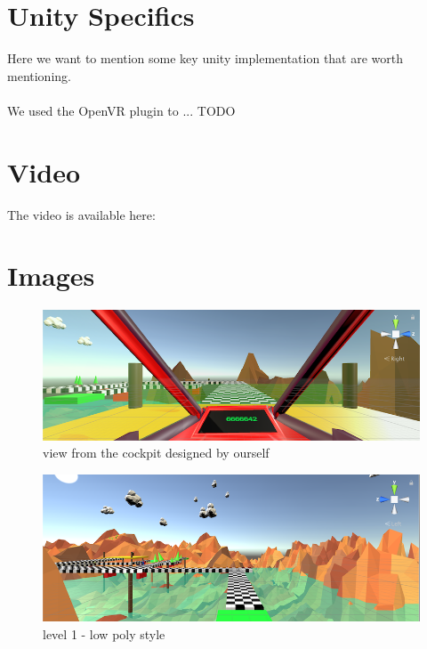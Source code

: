 \documentclass[12pt]{article}
\begin{document}
\section{Unity Specifics}
Here we want to mention some key unity implementation that are worth mentioning. \\\\

We used the OpenVR plugin to ... TODO


\section{Video}
The video is available here: 




\newpage

\section{Images}
\begin{figure}[h]
   \caption{\label{étiquette} view from the cockpit designed by ourself}
   \includegraphics[scale=1]{images/cockpit.png}
\end{figure}

\begin{figure}[h]
   \caption{\label{étiquette} level 1 - low poly style}
   \includegraphics[scale=1]{images/level.png}
\end{figure}
\end{document}
